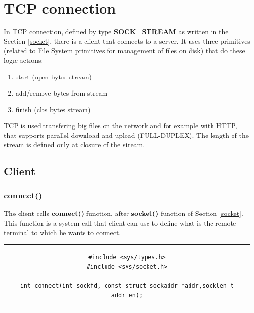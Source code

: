\section{TCP connection}
In TCP connection, defined by type \textbf{SOCK\_STREAM} as written in the Section \ref{socket}, there is a client that connects to a server. It uses three primitives (related to File System primitives for management of files on disk) that do these logic actions:
\begin{enumerate}
\item{start (open bytes stream)}
\item{add/remove bytes from stream}
\item{finish (clos bytes stream)}
\end{enumerate}
TCP is used transfering big files on the network and for example with HTTP, that supports parallel download and upload (FULL-DUPLEX). The length of the stream is defined only at closure of the stream.
 
\subsection{Client}
\subsubsection{connect()}
The client calls \textbf{connect()} function, after \textbf{socket()} function of Section \ref{socket}. This function is a system call that client can use to define what is the remote terminal to which he wants to connect.

\begin{center}
\begin{tabular}{c}
\begin{lstlisting}[linewidth=370pt, basicstyle=\footnotesize\sffamily,]
#include <sys/types.h>
#include <sys/socket.h>

int connect(int sockfd, const struct sockaddr *addr,socklen_t addrlen);
\end{lstlisting}
\end{tabular}
\end{center}

